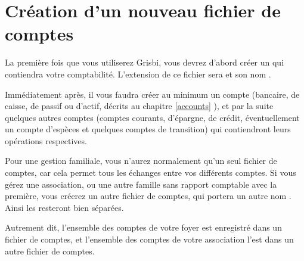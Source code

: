 \section{Création d'un nouveau fichier de comptes\label{start-newfile}}


La première fois que vous utiliserez Grisbi, vous devrez d'abord créer un  qui contiendra votre comptabilité. L'\gls{extension} de ce fichier sera  et son nom . 

Immédiatement après, il vous faudra créer au minimum un compte (bancaire, de caisse, de passif ou d'actif, décrits au chapitre \vref{accounts} ), et par la suite quelques autres comptes (comptes courants, d'épargne, de crédit, éventuellement un compte d'espèces et quelques comptes de transition) qui contiendront leurs opérations respectives. 

Pour une gestion familiale, vous n'aurez normalement qu'un seul fichier de comptes, car cela permet tous les échanges entre vos différents comptes. Si vous gérez une association, ou une autre famille sans rapport comptable avec la première, vous créerez un autre fichier de comptes, qui portera un autre nom . Ainsi les  resteront bien séparées.

Autrement dit, l’ensemble des comptes de votre foyer est enregistré dans un fichier de comptes,
et l’ensemble des comptes de votre association l’est dans un autre fichier de comptes.



